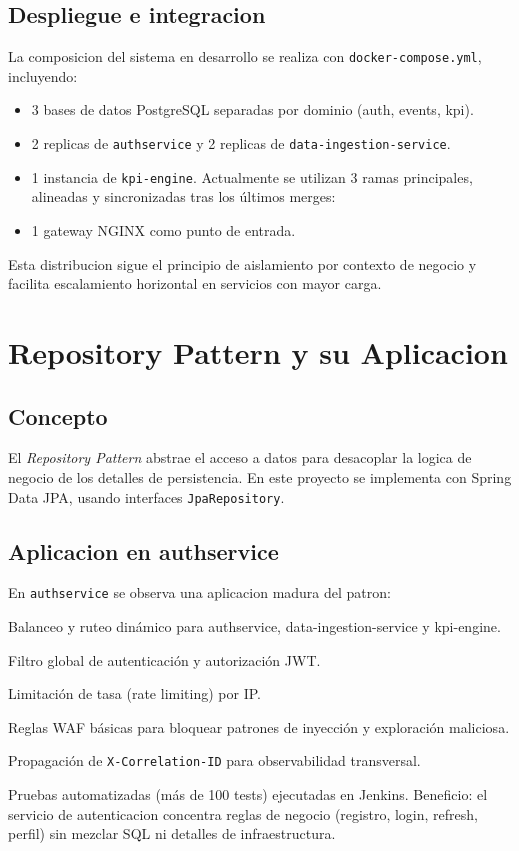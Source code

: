 \documentclass[12pt,a4paper]{article}
\begin{document}
\subsection{Despliegue e integracion}
La composicion del sistema en desarrollo se realiza con \texttt{docker-compose.yml}, incluyendo:
\begin{itemize}[leftmargin=*]
    \item 3 bases de datos PostgreSQL separadas por dominio (auth, events, kpi).
    \item 2 replicas de \texttt{authservice} y 2 replicas de \texttt{data-ingestion-service}.
    \item 1 instancia de \texttt{kpi-engine}.
Actualmente se utilizan 3 ramas principales, alineadas y sincronizadas tras los últimos merges:
    \item 1 gateway NGINX como punto de entrada.
\end{itemize}

Esta distribucion sigue el principio de aislamiento por contexto de negocio y facilita escalamiento horizontal en servicios con mayor carga.

\section{Repository Pattern y su Aplicacion}
\subsection{Concepto}
El \textit{Repository Pattern} abstrae el acceso a datos para desacoplar la logica de negocio de los detalles de persistencia. En este proyecto se implementa con Spring Data JPA, usando interfaces \texttt{JpaRepository}.

\subsection{Aplicacion en authservice}
En \texttt{authservice} se observa una aplicacion madura del patron:
    \item Balanceo y ruteo dinámico para authservice, data-ingestion-service y kpi-engine.
    \item Filtro global de autenticación y autorización JWT.
    \item Limitación de tasa (rate limiting) por IP.
    \item Reglas WAF básicas para bloquear patrones de inyección y exploración maliciosa.
    \item Propagación de \texttt{X-Correlation-ID} para observabilidad transversal.
    \item Pruebas automatizadas (más de 100 tests) ejecutadas en Jenkins.
Beneficio: el servicio de autenticacion concentra reglas de negocio (registro, login, refresh, perfil) sin mezclar SQL ni detalles de infraestructura.
\end{document}
